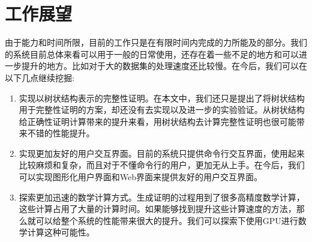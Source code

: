 \section{工作展望}
由于能力和时间所限，目前的工作只是在有限时间内完成的力所能及的部分。我们的系统目前总体来看可以用于一般的日常使用，还存在着一些不足的地方和可以进一步提升的地方。比如对于大的数据集的处理速度还比较慢。在今后，我们可以在以下几点继续挖掘:
\begin{enumerate}
\item 实现以树状结构表示的完整性证明。在本文中，我们还只是提出了将树状结构用于完整性证明的方案，却还没有去实现以及进一步的实验验证。从树状结构给正确性证明计算带来的提升来看，用树状结构去计算完整性证明也很可能带来不错的性能提升。
\item 实现更加友好的用户交互界面。目前的系统只提供命令行交互界面，使用起来比较麻烦和复杂，而且对于不懂命令行的用户，更加无从上手。在今后，我们可以实现图形化用户界面和Web界面来提供友好的用户交互界面。
\item 探索更加迅速的数学计算方式。生成证明的过程用到了很多高精度数学计算，这些计算占用了大量的计算时间。如果能够找到提升这些计算速度的方法，那么就可以给整个系统的性能带来很大的提升。我们可以探索下使用GPU进行数学计算这种可能性。
\end{enumerate}
